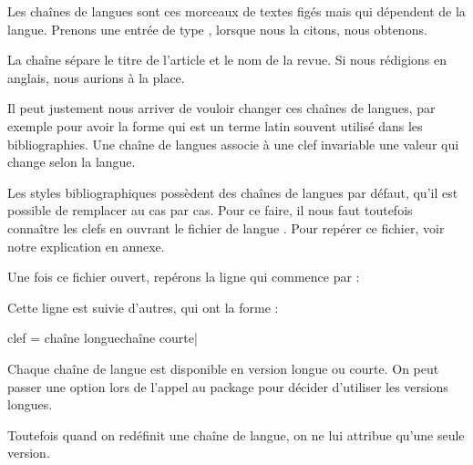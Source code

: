     Les chaînes de langues sont ces morceaux de textes figés mais qui dépendent de la langue. Prenons une entrée de type , lorsque nous la citons, nous obtenons.
    
     
     
    \begin{quotation}
        \cite{Junod1992}
    \end{quotation}
    
    La chaîne  sépare le titre de l'article et le nom de la revue. Si nous rédigions en anglais, nous aurions  à la place.  
    
    
    Il peut justement nous arriver de vouloir changer ces chaînes de langues, par exemple pour avoir la forme  qui est un terme latin souvent utilisé dans les bibliographies.  Une chaîne de langues associe à une clef invariable une valeur qui change selon la langue.
    
    Les styles bibliographiques possèdent des chaînes de langues par défaut, qu'il est possible de remplacer au cas par cas. Pour ce faire, il nous faut toutefois connaître les clefs en ouvrant le fichier de langue . Pour repérer ce fichier, voir notre explication en annexe.
    
    Une fois ce fichier ouvert, repérons la ligne qui commence par :
    

    
    Cette ligne est suivie d'autres, qui ont la forme :
    
    \begin{latexcode}
clef    = {{chaîne longue}{chaîne courte}}|
    \end{latexcode}

    
    \begin{plusloins}
    Chaque chaîne de langue est disponible en version longue ou courte. On peut passer une option lors de l'appel au package  pour décider d'utiliser les versions longues.
    
    \begin{latexcode}
\usepackage[abbreviate=false]{biblatex}
    \end{latexcode}

    
     Toutefois quand on redéfinit une chaîne de langue, on ne lui attribue qu'une seule version.
    
    \end{plusloins}
    
